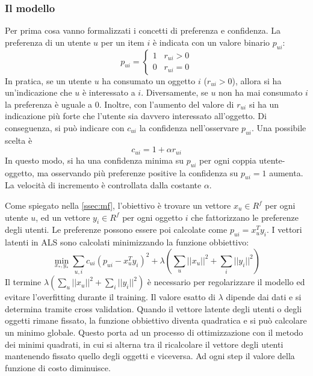 \subsubsection{Il modello}
Per prima cosa vanno formalizzati i concetti di preferenza e confidenza. La preferenza di un utente $u$ per un item $i$ è indicata con un valore binario $p_{ui}$:
$$
p_{ui} =     \begin{cases}
				1 \;\;\; r_{ui} > 0 \\
				0 \;\;\; r_{ui} = 0
              \end{cases}
$$
In pratica, se un utente $u$ ha consumato un oggetto $i$ ($r_{ui} > 0$), allora si ha un'indicazione che $u$ è interessato a $i$. Diversamente, se $u$ non ha mai consumato $i$ la preferenza è uguale a 0. Inoltre, con l'aumento del valore di $r_{ui}$ si ha un indicazione più forte che l'utente sia davvero interessato all'oggetto. Di conseguenza, si può indicare con $c_{ui}$ la confidenza nell'osservare $p_{ui}$. Una possibile scelta è
$$
c_{ui} = 1 + \alpha r_{ui}
$$
In questo modo, si ha una confidenza minima su $p_{ui}$ per ogni coppia utente-oggetto, ma osservando più preferenze positive la confidenza su $p_{ui} = 1$ aumenta. La velocità di incremento è controllata dalla costante $\alpha$.

Come spiegato nella \autoref{ssec:mf}, l'obiettivo è trovare un vettore $x_u \in R^f$ per ogni utente $u$, ed un vettore $y_i \in R^f$ per ogni oggetto $i$ che fattorizzano le preferenze degli utenti. Le preferenze possono essere poi calcolate come $p_{ui} = x_u^Ty_i$. I vettori latenti in ALS sono calcolati minimizzando la funzione obbiettivo:	
$$
\min_{x_*,y_*} \sum_{u,i} c_{ui} (p_{ui} - x_u^Ty_i)^2 + 
\lambda \left( \sum_u ||x_u||^2 + \sum_i ||y_i||^2 \right)
$$
Il termine $\lambda \left( \sum_u ||x_u||^2 + \sum_i ||y_i||^2 \right)$ è necessario per regolarizzare il modello ed evitare l'overfitting durante il training. Il valore esatto di $\lambda$ dipende dai dati e si determina tramite cross validation. 
Quando il vettore latente degli utenti o degli oggetti rimane fissato, la funzione obbiettivo diventa quadratica e si può calcolare un minimo globale. Questo porta ad un processo di ottimizzazione con il metodo dei minimi quadrati, in cui si alterna tra il ricalcolare il vettore degli utenti mantenendo fissato quello degli oggetti e viceversa. Ad ogni step il valore della funzione di costo diminuisce.


